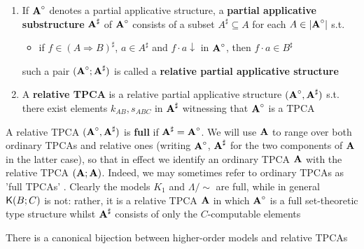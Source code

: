 \documentclass[11pt]{article}
\begin{document}
\begin{definition}[]


\begin{enumerate}
\item If \(\operatorname{\textbf{A}}^\circ\) denotes a partial applicative structure, a \textbf{partial applicative
substructure} \(\operatorname{\textbf{A}}^\sharp\) of \(\operatorname{\textbf{A}}^\circ\) consists of a subset \(A^\sharp\subseteq A\) for each \(A\in\abs{\bA^\circ}\) s.t.
\begin{itemize}
\item if \(f\in(A\Rightarrow B)^\sharp\), \(a\in A^\sharp\) and \(f\cdot a\downarrow\) in \(\operatorname{\textbf{A}}^\circ\), then \(f\cdot a\in B^\sharp\)
\end{itemize}

such a pair \((\operatorname{\textbf{A}}^\circ;\operatorname{\textbf{A}}^\sharp)\) is called a \textbf{relative partial applicative structure}

\item A \textbf{relative TPCA} is a relative partial applicative structure \((\operatorname{\textbf{A}}^\circ,\operatorname{\textbf{A}}^\sharp)\) s.t. there exist
elements \(k_{AB}, s_{ABC}\) in \(\operatorname{\textbf{A}}^\sharp\) witnessing that \(\operatorname{\textbf{A}}^\circ\) is a TPCA
\end{enumerate}
\end{definition}

A relative TPCA \((\operatorname{\textbf{A}}^\circ,\operatorname{\textbf{A}}^\sharp)\) is \textbf{full} if \(\operatorname{\textbf{A}}^\sharp=\operatorname{\textbf{A}}^\circ\). We will use \(\operatorname{\textbf{A}}\) to range over both
ordinary TPCAs and relative ones (writing \(\operatorname{\textbf{A}}^\circ\), \(\operatorname{\textbf{A}}^\sharp\) for the two components of \(\operatorname{\textbf{A}}\) in
the latter case), so that in effect we identify an ordinary TPCA \(\operatorname{\textbf{A}}\) with the relative
TPCA \((\operatorname{\textbf{A}};\operatorname{\textbf{A}})\). Indeed, we may sometimes refer to ordinary TPCAs as 'full TPCAs' . Clearly the
models \(K_1\) and \(\Lambda/\sim\) are full, while in general \(\textsf{K}(B;C)\) is not: rather, it is a
relative TPCA \(\operatorname{\textbf{A}}\) in which \(\operatorname{\textbf{A}}^\circ\) is a full set-theoretic type structure whilst \(\operatorname{\textbf{A}}^\sharp\)
consists of only the \(C\)-computable elements

\begin{theorem}[]
There is a canonical bijection between higher-order models and relative TPCAs
\end{theorem}
\end{document}
